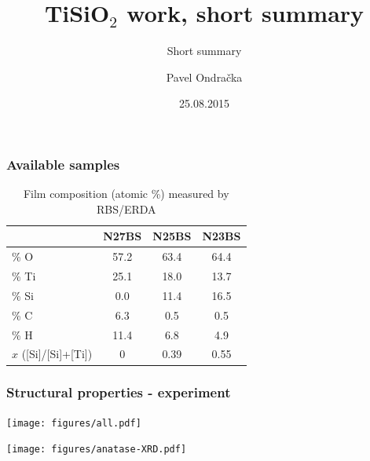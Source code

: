 \documentclass{beamer}
\begin{document}
\title[Ti$_x$Si$_{1-x}$O$_2$ work, short summary] %
{TiSiO$_2$ work, short summary}
\subtitle{Short summary}
\author{Pavel Ondračka}
\date{25.08.2015}

\maketitle



\begin{frame}
\frametitle{Available samples}

\begin{table}
	\begin{centering}
	\begin{tabular}{lccc}
		\hline
		& N27BS & N25BS & N23BS\\
		\hline \hline
		\% O & 57.2 & 63.4 & 64.4\\
		\% Ti & 25.1 & 18.0 & 13.7\\
		\% Si & 0.0 & 11.4 & 16.5\\
		\% C & 6.3 & 0.5 & 0.5 \\
		\% H & 11.4 & 6.8 & 4.9\\
		$x$ ([Si]/[Si]+[Ti]) & 0 & 0.39 & 0.55\\
 		\hline
	\end{tabular}
	\caption{Film composition (atomic \%) measured by RBS/ERDA}
	\label{RBS}
	\end{centering}
\end{table}


\end{frame}

\begin{frame}
\frametitle{Structural properties - experiment}
\begin{center}
	\texttt{[image: figures/all.pdf]}
\end{center}
\begin{center}
	\texttt{[image: figures/anatase-XRD.pdf]}
\end{center}
\end{frame}
\end{document}
